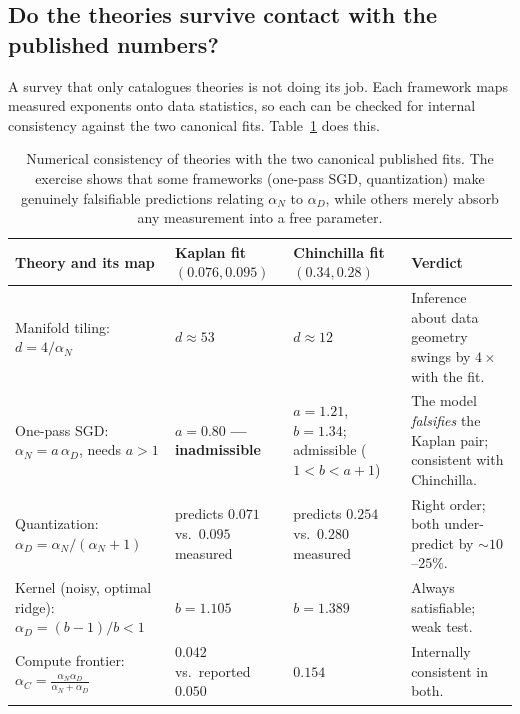 \documentclass[11pt,a4paper]{article}
\theoremstyle{definition}
\begin{document}
\subsection{Do the theories survive contact with the published numbers?}
\label{subsec:consistency}

A survey that only catalogues theories is not doing its job. Each framework maps measured exponents onto data statistics, so each can be checked for internal consistency against the two canonical fits. Table~\ref{tab:consistency} does this.

\begin{table}[htbp]
\centering
\small
\renewcommand{\arraystretch}{1.3}
\begin{tabularx}{\textwidth}{>{\raggedright\arraybackslash}p{4.0cm} >{\raggedright\arraybackslash}p{3.6cm} >{\raggedright\arraybackslash}p{3.4cm} >{\raggedright\arraybackslash}X}
\toprule
\textbf{Theory and its map} & \textbf{Kaplan fit} $(0.076,0.095)$ & \textbf{Chinchilla fit} $(0.34,0.28)$ & \textbf{Verdict} \\
\midrule
Manifold tiling: $d = 4/\alpha_N$ & $d\approx 53$ & $d\approx 12$ & Inference about data geometry swings by $4\times$ with the fit. \\
\midrule
One-pass SGD: $\alpha_N = a\,\alpha_D$, needs $a>1$ & $a = 0.80$ \textbf{--- inadmissible} & $a = 1.21$, $b=1.34$; admissible ($1<b<a+1$) & The model \emph{falsifies} the Kaplan pair; consistent with Chinchilla. \\
\midrule
Quantization: $\alpha_D = \alpha_N/(\alpha_N+1)$ & predicts $0.071$ vs.\ $0.095$ measured & predicts $0.254$ vs.\ $0.280$ measured & Right order; both under-predict by $\sim 10$--$25\%$. \\
\midrule
Kernel (noisy, optimal ridge): $\alpha_D = (b-1)/b < 1$ & $b = 1.105$ & $b = 1.389$ & Always satisfiable; weak test. \\
\midrule
Compute frontier: $\alpha_C = \frac{\alpha_N\alpha_D}{\alpha_N+\alpha_D}$ & $0.042$ vs.\ reported $0.050$ & $0.154$ & Internally consistent in both. \\
\bottomrule
\end{tabularx}
\caption{Numerical consistency of theories with the two canonical published fits. The exercise shows that some frameworks (one-pass SGD, quantization) make genuinely falsifiable predictions relating $\alpha_N$ to $\alpha_D$, while others merely absorb any measurement into a free parameter.}
\label{tab:consistency}
\end{table}
\end{document}
